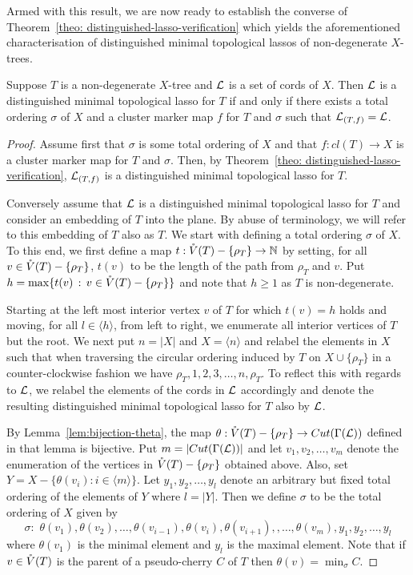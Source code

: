 Armed with this result, we are now ready to establish the converse of
Theorem~\ref{theo: distinguished-lasso-verification} which yields the
aforementioned characterisation of distinguished minimal topological lassos of
non-degenerate $X$-trees.

\begin{thm}
  \label{theo:characterization}
  Suppose $T$ is a non-degenerate $X$-tree and ${\mathcal L}$ is a set of cords of
  $X$. Then ${\mathcal L}$ is a distinguished minimal topological lasso for $T$ if and
  only if there exists a total ordering $\sigma$ of $X$ and a cluster marker
  map $f$ for $T$ and $\sigma$ such that ${\mathcal L}_{(T,f)}={\mathcal L}$.
\end{thm}
\begin{proof}
  Assume first that $\sigma$ is some total ordering of $X$ and that
  $f:cl(T)\to X$ is a cluster marker map for $T$ and $\sigma$. Then, by
  Theorem~\ref{theo: distinguished-lasso-verification}, ${\mathcal L}_{(T,f)}$ is a
  distinguished minimal topological lasso for $T$.

  Conversely assume that ${\mathcal L}$ is a distinguished minimal topological lasso
  for $T$ and consider an embedding of $T$ into the plane.  By abuse of
  terminology, we will refer to this embedding of $T$ also as $T$.  We start
  with defining a total ordering $\sigma$ of $X$.  To this end, we first
  define a map $t:\mathring{V}(T)-\{\rho_T\}\to \mathbb N$ by setting, for all $v\in
  \mathring{V}(T)-\{\rho_T\}$, $t(v)$ to be the length of the path from $\rho_T$ and
  $v$. Put $h=\max\{t(v)\,:\, v\in \mathring{V}(T)-\{\rho_T\}\}$ and note that $h\geq
  1$ as $T$ is non-degenerate.

  Starting at the left most interior vertex $v$ of $T$ for which $t(v)=h$
  holds and moving, for all $l \in \langle h\rangle$, from left to right, we
  enumerate all interior vertices of $T$ but the root. We next put $n=|X|$ and
  $X=\langle n\rangle$ and relabel the elements in $X$ such that when
  traversing the circular ordering induced by $T$ on $X\cup\{\rho_T\}$ in a
  counter-clockwise fashion we have $\rho_T,1,2,3,\ldots, n,\rho_T$. To
  reflect this with regards to ${\mathcal L}$, we relabel the elements of the cords in
  ${\mathcal L}$ accordingly and denote the resulting distinguished minimal topological
  lasso for $T$ also by ${\mathcal L}$.

  By Lemma~\ref{lem:bijection-theta}, the map $\theta :\mathring{V}(T)-\{\rho_T\} \to
  Cut(\Gamma({\mathcal L}))$ defined in that lemma is bijective. Put
  $m=|Cut(\Gamma({\mathcal L}))|$ and let $v_1,v_2,\ldots, v_m$ denote the enumeration
  of the vertices in $\mathring{V}(T)-\{\rho_T\}$ obtained above. Also, set
  $Y=X-\{\theta(v_i): i\in \langle m\rangle\}$. Let $y_1,y_2,\ldots, y_l$
  denote an arbitrary but fixed total ordering of the elements of $Y$ where
  $l=|Y|$. Then we define $\sigma$ to be the total ordering of $X$ given by
  $$
  \sigma:\,\, \theta(v_1),\theta(v_2),\ldots, \theta(v_{i-1}),
  \theta(v_i),\theta(v_{i+1}), ,\ldots, \theta(v_m),y_1,y_2,\ldots, y_l
  $$ 
  where $\theta(v_1)$ is the minimal element and $y_l$ is the maximal element.
  Note that if $v\in \mathring{V}(T)$ is the parent of a pseudo-cherry $C$ of $T$ then
  $\theta(v)=\min_{\sigma}C$.



\end{proof}
